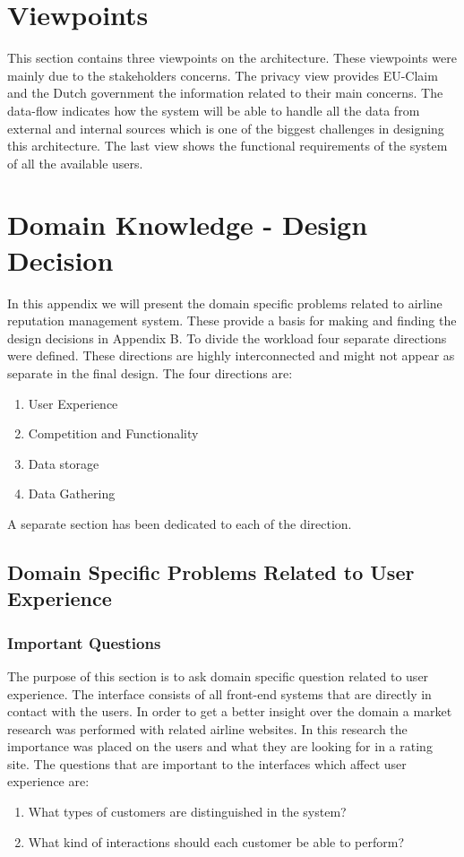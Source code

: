 \documentclass{article}
\begin{document}
\section{Viewpoints}

This section contains three viewpoints on the architecture. These viewpoints were mainly due to the stakeholders concerns. The privacy view provides EU-Claim and the Dutch government the information related to their
main concerns. The data-flow indicates how the system will be able to handle all the data from external and internal sources which is one of the biggest challenges in designing this architecture. The last view shows the functional
requirements of the system of all the available users. 






\appendix

\section{Domain Knowledge - Design Decision}
In this appendix we will present the domain specific problems related to airline reputation management system. These provide a basis for making and finding the design decisions in Appendix B. 
To divide the workload four separate directions were defined. These directions are highly interconnected and might not appear as separate in the final design. The four directions are:
\begin{enumerate}
\item User Experience
\item Competition and Functionality
\item Data storage
\item Data Gathering
\end{enumerate}
A separate section has been dedicated to each of the direction. 

\subsection{Domain Specific Problems Related to User Experience}
\subsubsection{Important Questions}
The purpose of this section is to ask domain specific question related to user experience. The interface consists of all front-end systems that are directly in contact with the users. 
In order to get a better insight over the domain a market research was performed with related airline websites. In this research the importance was placed on the users and what they are looking for in a rating site. 
The questions that  are important to the interfaces which affect user experience are:
\begin{enumerate}
\item What types of customers are distinguished in the system?
\item What kind of interactions should each customer be able to perform?
\end{enumerate}
\end{document}
